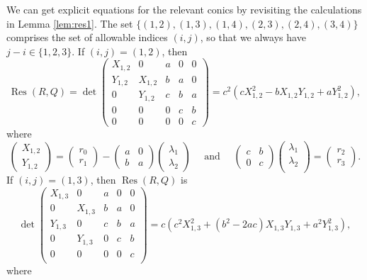 \documentclass[reqno, 12pt, twoside]{amsart}
\numberwithin{equation}{section}
\DeclareMathOperator{\Res}{Res}
\newcommand{\0}{\mathbf{0}}
\theoremstyle{definition}
\begin{document}
We can get explicit equations for the relevant conics by revisiting the calculations in 
Lemma \ref{lem:res1}.
The set 
$\{(1,2),(1,3),(1,4),(2,3),(2,4),(3,4)\}$  comprises the set of allowable indices $(i,j)$,
so that we always have  $j-i\in\{1,2,3\}$.
If $(i,j)=(1,2)$, then
\[
\Res(R,Q)=
\det\begin{pmatrix}
X_{1,2} & 0 & a& 0&  0    \\
Y_{1,2} & X_{1,2}& b& a& 0    \\
0 & Y_{1,2}& c& b& a   \\
0 & 0& 0& c& b  \\
0 & 0& 0& 0&  c    
\end{pmatrix}=c^2 (c X_{1,2}^2- b X_{1,2} Y_{1,2} +a Y_{1,2}^2  ),\]
where 
\[\begin{pmatrix}
X_{1,2}\\
Y_{1,2}\end{pmatrix}
=\begin{pmatrix}
r_0\\
r_1\end{pmatrix}
-\begin{pmatrix}
a & 0     \\
b & a 
\end{pmatrix}\begin{pmatrix}
\lambda_1    \\
\lambda_2   
\end{pmatrix}\quad\text{ and }\quad\begin{pmatrix}
c & b    \\
0 & c
\end{pmatrix}\begin{pmatrix}
\lambda_1    \\
\lambda_2   \\  
\end{pmatrix}=\begin{pmatrix}
r_2    \\
r_3   
\end{pmatrix}.\]
If $(i,j)=(1,3)$, then $\Res(R,Q)$ is 
\[\det\begin{pmatrix}
X_{1,3} & 0 & a& 0&  0    \\
0 & X_{1,3}& b& a& 0    \\
Y_{1,3} & 0& c& b& a   \\
0 & Y_{1,3}& 0& c& b  \\
0 & 0& 0& 0&  c    \\
\end{pmatrix}=c (c^2 X_{1,3}^2+(b^2- 2 a c) X_{1,3} Y_{1,3} +a^2 Y_{1,3}^2),\]
where 
\end{document}
